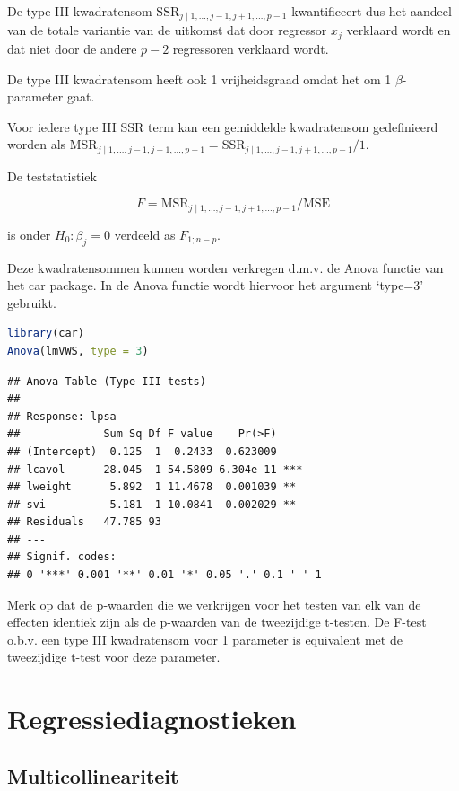 \documentclass[
  12pt,dutch,coursenotes]{book}
\begin{document}
De type III kwadratensom \(\text{SSR}_{j \mid 1,\ldots, j-1,j+1,\ldots, p-1}\) kwantificeert dus het aandeel van de totale variantie van de uitkomst dat door regressor \(x_j\) verklaard wordt en dat niet door de andere \(p-2\) regressoren verklaard wordt.

De type III kwadratensom heeft ook 1 vrijheidsgraad omdat het om 1 \(\beta\)-parameter gaat.

Voor iedere type III SSR term kan een gemiddelde kwadratensom gedefinieerd worden als \(\text{MSR}_{j \mid 1,\ldots, j-1,j+1,\ldots, p-1}=\text{SSR}_{j \mid 1,\ldots, j-1,j+1,\ldots, p-1}/1\).

De teststatistiek

\[
F=\text{MSR}_{j \mid 1,\ldots, j-1,j+1,\ldots, p-1}/\text{MSE}
\]

is onder \(H_0:\beta_j=0\) verdeeld as \(F_{1;n-p}\).

Deze kwadratensommen kunnen worden verkregen d.m.v. de Anova functie van het car package. In de Anova functie wordt hiervoor het argument `type=3' gebruikt.

\begin{lstlisting}[language=R]
library(car)
Anova(lmVWS, type = 3)
\end{lstlisting}

\begin{lstlisting}
## Anova Table (Type III tests)
## 
## Response: lpsa
##             Sum Sq Df F value    Pr(>F)    
## (Intercept)  0.125  1  0.2433  0.623009    
## lcavol      28.045  1 54.5809 6.304e-11 ***
## lweight      5.892  1 11.4678  0.001039 ** 
## svi          5.181  1 10.0841  0.002029 ** 
## Residuals   47.785 93                      
## ---
## Signif. codes:  
## 0 '***' 0.001 '**' 0.01 '*' 0.05 '.' 0.1 ' ' 1
\end{lstlisting}

Merk op dat de p-waarden die we verkrijgen voor het testen van elk van de effecten identiek zijn als de p-waarden van de tweezijdige t-testen.
De F-test o.b.v. een type III kwadratensom voor 1 parameter is equivalent met de tweezijdige t-test voor deze parameter.

\hypertarget{regressiediagnostieken}{%
\section{Regressiediagnostieken}\label{regressiediagnostieken}}

\hypertarget{multicollineariteit}{%
\subsection{Multicollineariteit}\label{multicollineariteit}}
\end{document}
